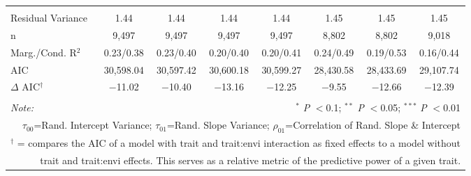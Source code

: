 \documentclass[12pt, letterpaper]{article}
\begin{document}
\begin{table}[h]
{\begin{tabular}{lccccccc}
\hline \\[-1.8ex] 
\rowcolor[gray]{.95} Residual Variance & 1.44 & 1.44 & 1.44 & 1.44 & 1.45 & 1.45 & 1.45 \\
n & 9,497 & 9,497 & 9,497 & 9,497 & 8,802 & 8,802 & 9,018 \\ 
\rowcolor[gray]{.95} Marg./Cond. R$^2$ & 0.23/0.38 & 0.23/0.40	& 0.20/0.40 & 0.20/0.41	& 0.24/0.49 & 0.19/0.53 & 0.16/0.44\\
AIC & 30,598.04 & 30,597.42 & 30,600.18 & 30,599.27 & 28,430.58 & 28,433.69 & 29,107.74 \\ 
\hline 
\rowcolor[gray]{.95}$\Delta$ AIC$^\dagger$  & $-$11.02 & $-$10.40 & $-$13.16 & $-$12.25 & $-$9.55 & $-$12.66 & $-$12.39 \\
\hline 
\hline \\[-1.8ex] 
\textit{Note:}  & \multicolumn{7}{r}{$^{*}$ \textit{P} $<$0.1; $^{**}$ \textit{P} $<$0.05; $^{***}$ \textit{P} $<$0.01}\\
\multicolumn{8}{r}{$\tau_{00}$=Rand. Intercept Variance; $\tau_{01}$=Rand. Slope Variance; $\rho_{01}$=Correlation of Rand. Slope \& Intercept}\\ 
\multicolumn{8}{r}{$^\dagger$ = compares the AIC of a model with trait and trait:envi interaction as fixed effects to a model without}\\
\multicolumn{8}{r}{trait and trait:envi effects. This serves as a relative metric of the predictive power of a given trait.}
\end{tabular}} 
\end{table} 
\end{document}
